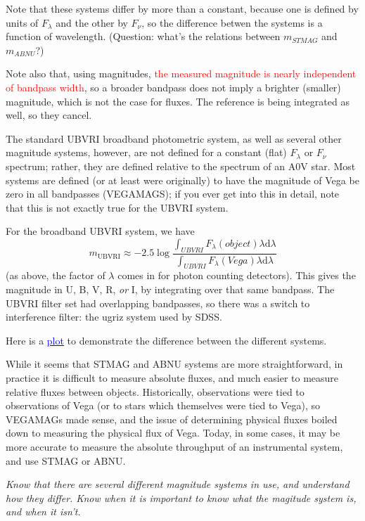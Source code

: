 \documentclass[12pt]{article}
\begin{document}
Note that these systems differ by more than a constant,
because one is defined by units of $F_{\lambda}$ and the other by $F_{\nu}$,
so the difference betwen the systems is a function of wavelength.
(Question: what's the relations between $m_{STMAG}$ and $m_{ABNU}$?)

Note also that, using magnitudes,
\textcolor{red}{the measured magnitude is
nearly independent of bandpass width}, so a broader bandpass does not
imply a brighter (smaller) magnitude, which is not the case for
fluxes. The reference is being integrated as well, so they cancel.

The standard UBVRI broadband photometric system, as well as
several other magnitude systems, however, are not defined for a
constant (flat) $F_{\lambda}$ or $F_{\nu}$ spectrum; rather, they are defined
relative to the spectrum of an A0V star. Most systems are defined (or
at least were originally) to have the magnitude of Vega be zero in all
bandpasses (VEGAMAGS); if you ever get into this in detail, note that
this is not exactly true for the UBVRI system.

For the broadband UBVRI system, we have
$$    m_{\textrm{UBVRI}} \approx -2.5 \log
    \frac{\int_{UBVRI}F_{\lambda}(object)\lambda\textrm{d}\lambda}
    {\int_{UBVRI}F_{\lambda}(Vega)\lambda\textrm{d}\lambda} $$
(as above, the factor of $\lambda$ comes in for photon counting
detectors). This gives the magnitude in U, B, V, R, \emph{or} I,
by integrating over that same bandpass.
The UBVRI filter set had overlapping bandpasses, so
there was a switch to interference filter: the ugriz system used
by SDSS\@.

Here is a
\href{http://astronomy.nmsu.edu/holtz/a535/html/diagrams/a535/mag.htm}
{\textcolor{blue}{plot}}
to demonstrate the difference between the different systems.

While it seems that STMAG and ABNU systems are more
straightforward, in practice it is difficult to measure absolute
fluxes, and much easier to measure relative fluxes between objects.
Historically, observations were tied to observations of Vega (or
to stars which themselves were tied to Vega), so VEGAMAGs made sense,
and the issue of determining physical fluxes boiled down to measuring
the physical flux of Vega. Today, in some cases, it may be more
accurate to measure the absolute throughput of an instrumental system,
and use STMAG or ABNU.

\textcolor{om}{\emph{Know that there are several different magnitude
systems in use, and understand how they differ. Know when it is
important to know what the magitude system is, and when it isn't.}}
\end{document}
